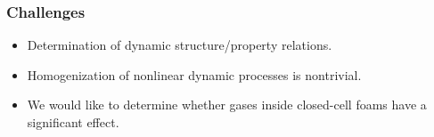 \documentclass{beamer}
\begin{document}
    \begin{frame}
      \frametitle{Challenges}
      \begin{itemize}[<+-| alert@+>]
        \item Determination of dynamic structure/property relations.\\
              \vspace{12pt}
        \item Homogenization of nonlinear dynamic processes
              is nontrivial.\\
              \vspace{12pt}
        \item We would like to determine whether gases inside
              closed-cell foams have a significant effect. 
      \end{itemize}
    \end{frame}
\end{document}
